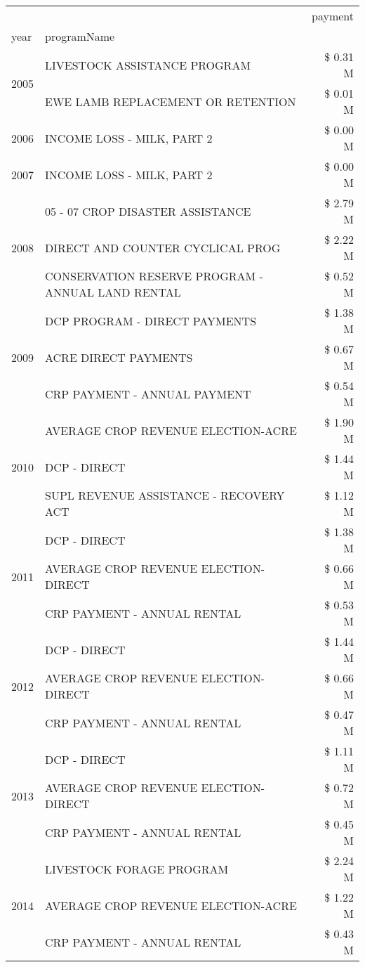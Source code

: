 \begin{tabular}{llr}
\toprule
 &  & payment \\
year & programName &  \\
\midrule
\multirow[t]{2}{*}{2005} & LIVESTOCK ASSISTANCE PROGRAM & \$ 0.31 M \\
 & EWE LAMB REPLACEMENT OR RETENTION & \$ 0.01 M \\
\cline{1-3}
2006 & INCOME LOSS - MILK, PART 2 & \$ 0.00 M \\
\cline{1-3}
2007 & INCOME LOSS - MILK, PART 2 & \$ 0.00 M \\
\cline{1-3}
\multirow[t]{3}{*}{2008} & 05 - 07 CROP DISASTER ASSISTANCE & \$ 2.79 M \\
 & DIRECT AND COUNTER CYCLICAL PROG & \$ 2.22 M \\
 & CONSERVATION RESERVE PROGRAM - ANNUAL LAND RENTAL & \$ 0.52 M \\
\cline{1-3}
\multirow[t]{3}{*}{2009} & DCP PROGRAM - DIRECT PAYMENTS & \$ 1.38 M \\
 & ACRE DIRECT PAYMENTS & \$ 0.67 M \\
 & CRP PAYMENT - ANNUAL PAYMENT & \$ 0.54 M \\
\cline{1-3}
\multirow[t]{3}{*}{2010} & AVERAGE CROP REVENUE ELECTION-ACRE & \$ 1.90 M \\
 & DCP - DIRECT & \$ 1.44 M \\
 & SUPL REVENUE ASSISTANCE - RECOVERY ACT & \$ 1.12 M \\
\cline{1-3}
\multirow[t]{3}{*}{2011} & DCP - DIRECT & \$ 1.38 M \\
 & AVERAGE CROP REVENUE ELECTION-DIRECT & \$ 0.66 M \\
 & CRP PAYMENT - ANNUAL RENTAL & \$ 0.53 M \\
\cline{1-3}
\multirow[t]{3}{*}{2012} & DCP - DIRECT & \$ 1.44 M \\
 & AVERAGE CROP REVENUE ELECTION-DIRECT & \$ 0.66 M \\
 & CRP PAYMENT - ANNUAL RENTAL & \$ 0.47 M \\
\cline{1-3}
\multirow[t]{3}{*}{2013} & DCP - DIRECT & \$ 1.11 M \\
 & AVERAGE CROP REVENUE ELECTION-DIRECT & \$ 0.72 M \\
 & CRP PAYMENT - ANNUAL RENTAL & \$ 0.45 M \\
\cline{1-3}
\multirow[t]{3}{*}{2014} & LIVESTOCK FORAGE PROGRAM & \$ 2.24 M \\
 & AVERAGE CROP REVENUE ELECTION-ACRE & \$ 1.22 M \\
 & CRP PAYMENT - ANNUAL RENTAL & \$ 0.43 M \\

\end{tabular}
